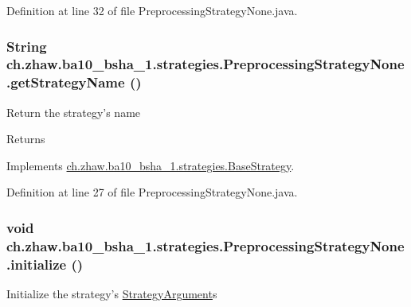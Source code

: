 Definition at line 32 of file PreprocessingStrategyNone.java.\hypertarget{classch_1_1zhaw_1_1ba10__bsha__1_1_1strategies_1_1PreprocessingStrategyNone_ae9f3b294f1a1d8b53e604256cc0a796f}{
\subsubsection[{getStrategyName}]{\setlength{\rightskip}{0pt plus 5cm}String ch.zhaw.ba10\_\-bsha\_\-1.strategies.PreprocessingStrategyNone.getStrategyName ()}}
\label{classch_1_1zhaw_1_1ba10__bsha__1_1_1strategies_1_1PreprocessingStrategyNone_ae9f3b294f1a1d8b53e604256cc0a796f}
Return the strategy's name

\begin{DoxyReturn}{Returns}

\end{DoxyReturn}


Implements \hyperlink{classch_1_1zhaw_1_1ba10__bsha__1_1_1strategies_1_1BaseStrategy_aa0ebed55eed45409bad13d43a0058780}{ch.zhaw.ba10\_\-bsha\_\-1.strategies.BaseStrategy}.

Definition at line 27 of file PreprocessingStrategyNone.java.\hypertarget{classch_1_1zhaw_1_1ba10__bsha__1_1_1strategies_1_1PreprocessingStrategyNone_a76d2204685b040adc9183d5ea705ef8c}{
\subsubsection[{initialize}]{\setlength{\rightskip}{0pt plus 5cm}void ch.zhaw.ba10\_\-bsha\_\-1.strategies.PreprocessingStrategyNone.initialize ()}}
\label{classch_1_1zhaw_1_1ba10__bsha__1_1_1strategies_1_1PreprocessingStrategyNone_a76d2204685b040adc9183d5ea705ef8c}
Initialize the strategy's \hyperlink{classch_1_1zhaw_1_1ba10__bsha__1_1_1StrategyArgument}{StrategyArgument}s 


